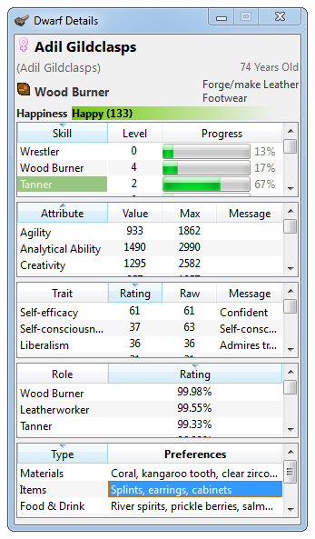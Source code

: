 \documentclass[]{article}
\begin{document}
\begin{itemize}
\begin{figure}[h!]
        \centering
        \begin{subfigure}[C]{0.45\linewidth}
                \centering
                \includegraphics[width=.75\textwidth]{Sec1Fig16-1}
        \end{subfigure}~
        \begin{subfigure}[C]{0.45\linewidth}
                \centering

\end{subfigure}
\end{figure}
\end{itemize}
\end{document}
